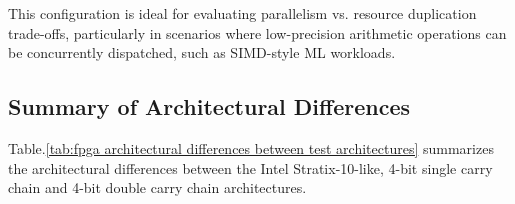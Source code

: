 This configuration is ideal for evaluating parallelism vs. resource duplication trade-offs, particularly in scenarios where low-precision arithmetic operations can be concurrently dispatched, such as SIMD-style ML workloads.

\subsection{Summary of Architectural Differences}
Table.\ref{tab:fpga architectural differences between test architectures} summarizes the architectural differences between the Intel Stratix-10-like, 4-bit single carry chain and 4-bit double carry chain architectures.

